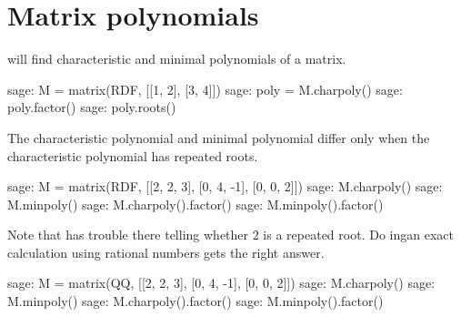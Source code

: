 





\section{Matrix polynomials}

\Sage{} will find characteristic and minimal polynomials of a matrix.
\begin{sagecommandline}
sage: M =  matrix(RDF, [[1, 2], [3, 4]]) 
sage: poly = M.charpoly()
sage: poly.factor()
sage: poly.roots()
\end{sagecommandline}

The characteristic polynomial and minimal polynomial differ only when 
the characteristic polynomial has repeated roots.
\begin{sagecommandline}
sage: M =  matrix(RDF, [[2, 2, 3], [0, 4, -1], [0, 0, 2]]) 
sage: M.charpoly()
sage: M.minpoly()
sage: M.charpoly().factor()
sage: M.minpoly().factor()
\end{sagecommandline}
Note that \Sage{} has trouble there telling whether $2$ is a repeated 
root.
Do ingan exact calculation using 
rational numbers gets the right answer.  
\begin{sagecommandline}
sage: M =  matrix(QQ, [[2, 2, 3], [0, 4, -1], [0, 0, 2]]) 
sage: M.charpoly()
sage: M.minpoly()
sage: M.charpoly().factor()
sage: M.minpoly().factor()
\end{sagecommandline}

